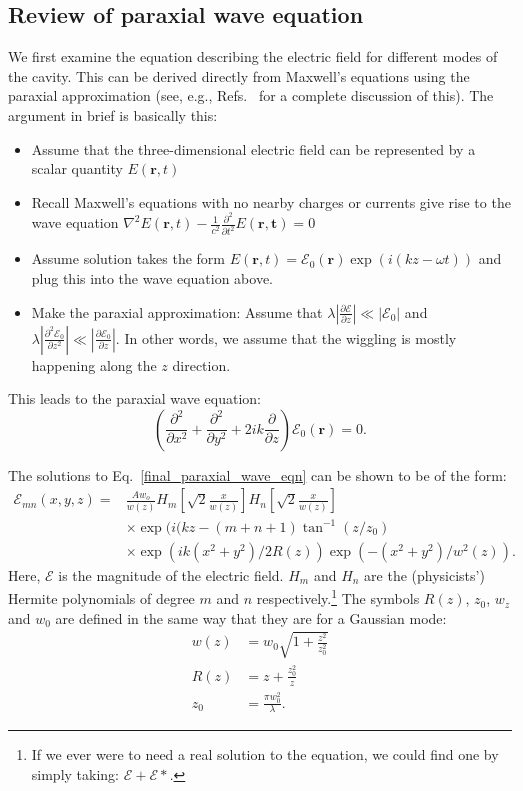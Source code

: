 \subsection{Review of paraxial wave equation}

We first examine the equation describing the electric field for different modes of the cavity. This can be derived directly from Maxwell's equations using the paraxial approximation (see, e.g., Refs.\ \cite{lasersMilonniEberly,bergeson_amo_notes} for a complete discussion of this). The argument in brief is basically this: 
\begin{itemize}
\item Assume that the three-dimensional electric field can be represented by a scalar quantity $E(\mathbf{r},t)$
\item Recall Maxwell's equations with no nearby charges or currents give rise to the wave equation $\nabla^2E(\mathbf{r},t)-\frac{1}{c^2} \frac{\partial^2}{\partial t^2} E(\mathbf{r,t})=0$
\item Assume solution takes the form $E(\mathbf{r},t) = \mathcal{E}_0(\mathbf{r}) \exp(i(kz-\omega t))$ and plug this into the wave equation above. 
\item Make the paraxial approximation: Assume that $\lambda \left|\frac{\partial \mathcal{E}}{\partial z} \right| \ll |\mathcal{E}_0|$ and $\lambda \left| \frac{\partial^2\mathcal{E}_0}{\partial z^2}\right| \ll \left| \frac{\partial \mathcal{E}_0}{\partial z}\right|$. In other words, we assume that the wiggling
is mostly happening along the $z$ direction. 
\end{itemize}
This leads to the paraxial wave equation: 
\begin{equation}
\left(\frac{\partial^2}{\partial x^2}+\frac{\partial^2}{\partial y^2}+2ik\frac{\partial}{\partial z}\right) \mathcal{E}_0(\mathbf{r})=0 \label{final_paraxial_wave_eqn}.
\end{equation}

The solutions to Eq.\ \ref{final_paraxial_wave_eqn} can be shown to be of the form:
\begin{align} \label{solutionToParaxial}
\mathcal{E}_{mn}(x,y,z)=&\frac{Aw_o}{w(z)}H_m\left[\sqrt{2}\frac{x}{w(z)}\right]H_n\left[\sqrt{2}\frac{x}{w(z)}\right] \\
&\times \exp(i(kz-(m+n+1)\tan^{-1}(z/z_0)\\
&\times \exp(ik(x^2+y^2)/2R(z)) \exp(-(x^2+y^2)/w^2(z)).
\end{align}
Here, $\mathcal{E}$ is the magnitude of the electric field. $H_m$ and $H_n$ are the (physicists') Hermite polynomials of degree $m$ and $n$ respectively.\footnote{If we ever were to need a real solution to the equation, we could find one by simply taking: $\mathcal{E}+\mathcal{E}*$.} The symbols $R(z)$, $z_0$, $w_z$ and $w_0$ are defined in the same way that they are for a Gaussian mode:
\begin{align}
w(z)&=w_0 \sqrt{1+\frac{z^2}{z_0^2}} \\
R(z)&=z+\frac{z_0^2}{z}\\
z_0&=\frac{\pi w_0^2}{\lambda }.
\end{align}

